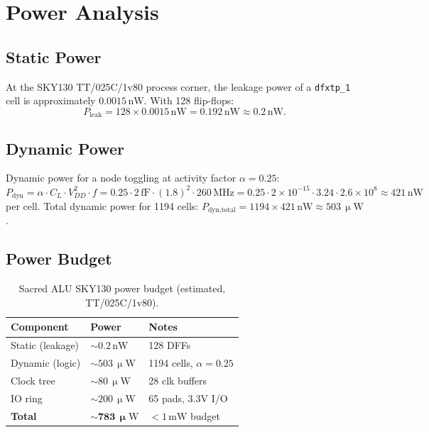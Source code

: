 \section{Power Analysis}
\label{sec:72:power}

\subsection{Static Power}
\label{subsec:72:static-power}

At the SKY130 TT/025C/1v80 process corner, the leakage power
of a \texttt{dfxtp\_1} cell is approximately $0.0015\,\mathrm{nW}$.
With 128 flip-flops:
\[
  P_{\text{leak}} = 128 \times 0.0015\,\mathrm{nW} = 0.192\,\mathrm{nW} \approx 0.2\,\mathrm{nW}.
\]

\subsection{Dynamic Power}
\label{subsec:72:dynamic-power}

Dynamic power for a node toggling at activity factor $\alpha = 0.25$:
\[
  P_{\text{dyn}} = \alpha \cdot C_L \cdot V_{DD}^2 \cdot f
  = 0.25 \cdot 2\,\mathrm{fF} \cdot (1.8)^2 \cdot 260\,\mathrm{MHz}
  = 0.25 \cdot 2 \times 10^{-15} \cdot 3.24 \cdot 2.6 \times 10^{8}
  \approx 421\,\mathrm{nW}
\]
per cell.
Total dynamic power for 1194 cells:
$P_{\text{dyn,total}} = 1194 \times 421\,\mathrm{nW} \approx 503\,\upmu\mathrm{W}$.

\subsection{Power Budget}
\label{subsec:72:power-budget}

\begin{table}[H]
\centering
\caption{Sacred ALU SKY130 power budget (estimated, TT/025C/1v80).}
\label{tab:72:power-budget}
\small
\begin{tabular}{lll}
\toprule
Component & Power & Notes \\
\midrule
Static (leakage) & $\sim 0.2\,\mathrm{nW}$ & 128 DFFs \\
Dynamic (logic) & $\sim 503\,\upmu\mathrm{W}$ & 1194 cells, $\alpha=0.25$ \\
Clock tree & $\sim 80\,\upmu\mathrm{W}$ & 28 clk buffers \\
IO ring & $\sim 200\,\upmu\mathrm{W}$ & 65 pads, 3.3V I/O \\
\textbf{Total} & $\sim \mathbf{783\,\upmu\mathrm{W}}$ & $< 1\,\mathrm{mW}$ budget \\
\bottomrule
\end{tabular}
\end{table}

